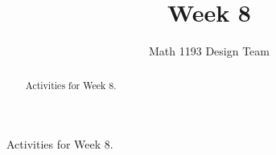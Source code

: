 \documentclass[noauthor,noinstructornotes]{ximera}
\title{Week 8}
\author{Math 1193 Design Team}
\begin{document}
\begin{abstract}
    Activities for Week 8.
\end{abstract}
\maketitle

Activities for Week 8.
\end{document}
